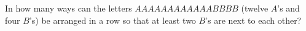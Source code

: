 In how many ways can the letters $AAAAAAAAAAAABBBB$ (twelve $A$'s and four $B$'s) be arranged in a row so that at least two $B$'s are next to each other?
